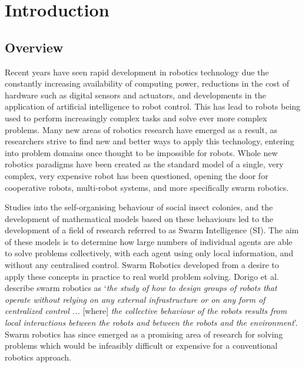 
\chapter[Introduction]{Introduction} %

\label{Chapter1} %


\newcommand{\keyword}[1]{\textbf{#1}}
\newcommand{\tabhead}[1]{\textbf{#1}}
\newcommand{\code}[1]{\texttt{#1}}
\newcommand{\file}[1]{\texttt{\bfseries#1}}
\newcommand{\option}[1]{\texttt{\itshape#1}}


\section{Overview}
Recent years have seen rapid development in robotics technology due the constantly increasing availability of computing power, reductions in the cost of hardware such as digital sensors and actuators, and developments in the application of artificial intelligence to robot control. This has lead to robots being used to perform increasingly complex tasks and solve ever more complex problems. Many new areas of robotics research have emerged as a result, as researchers strive to find new and better ways to apply this technology, entering into problem domains once thought to be impossible for robots. Whole new robotics paradigms have been created as the standard model of a single, very complex, very expensive robot has been questioned, opening the door for cooperative robots, multi-robot systems, and more specifically swarm robotics.

Studies into the self-organising behaviour of social insect colonies, and the development of mathematical models based on these behaviours led to the development of a field of research referred to as Swarm Intelligence (SI). The aim of these models is to determine how large numbers of individual agents are able to solve problems collectively, with each agent using only local information, and without any centralised control. Swarm Robotics developed from a desire to apply these concepts in practice to real world problem solving. Dorigo et al. describe swarm robotics as `\textit{the study of how to design groups of robots that operate without relying on any external infrastructure or on any form of centralized control ... }[where]\textit{ the collective behaviour of the robots results from local interactions between the robots and between the robots and the environment}\cite{Dorigo:2014}'. Swarm robotics has since emerged as a promising area of research for solving problems which would be infeasibly difficult or expensive for a conventional robotics approach.

